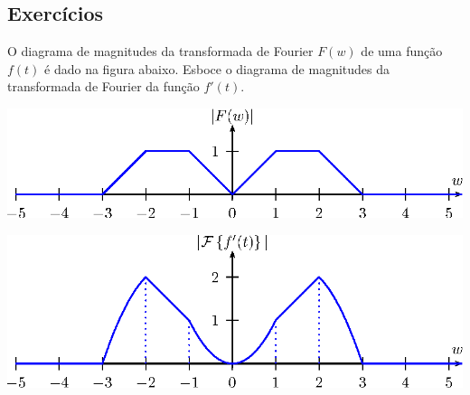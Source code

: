 \subsection*{Exercícios}
\begin{exer}O diagrama de magnitudes da transformada de Fourier $F(w)$ de uma função $f(t)$ é dado na figura abaixo. Esboce o diagrama de magnitudes da transformada de Fourier da função $f'(t)$. 
    \begin{center}
\includegraphics{cap_propriedades_transformada/pics/figura_1}
    \end{center}
 
\end{exer}
\begin{resp}
    \includegraphics{cap_propriedades_transformada/pics/figura_1b}
\end{resp}

